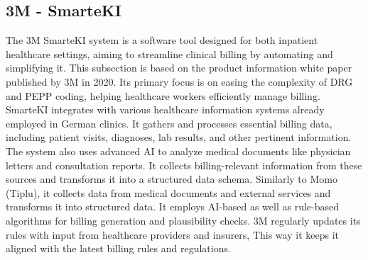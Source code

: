\subsection{3M - SmarteKI}\label{subsec:3m---smarteki}
The 3M SmarteKI system is a software tool designed for both inpatient healthcare settings, aiming to streamline clinical billing by automating and simplifying it.
This subsection is based on the product information white paper published by 3M in 2020\cite{3mSmarteKI}.
Its primary focus is on easing the complexity of DRG and PEPP coding, helping healthcare workers efficiently manage billing.
SmarteKI integrates with various healthcare information systems already employed in German clinics.
It gathers and processes essential billing data, including patient visits, diagnoses, lab results, and other pertinent information.
The system also uses advanced AI to analyze medical documents like physician letters and consultation reports.
It collects billing-relevant information from these sources and transforms it into a structured data schema.
Similarly to Momo (Tiplu), it collects data from medical documents and external services and transforms it into structured data.
It employs AI-based as well as rule-based algorithms for billing generation and plausibility checks.
3M regularly updates its rules with input from healthcare providers and insurers,
This way it keeps it aligned with the latest billing rules and regulations.

